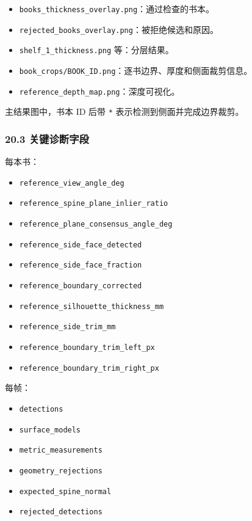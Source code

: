 \documentclass[
  chinese,
  11pt,
  a4paper,
]{article}
\providecommand{\tightlist}{%
  \setlength{\itemsep}{0pt}\setlength{\parskip}{0pt}}
\begin{document}
\begin{itemize}
\tightlist
\item
  \texttt{books\_thickness\_overlay.png}：通过检查的书本。
\item
  \texttt{rejected\_books\_overlay.png}：被拒绝候选和原因。
\item
  \texttt{shelf\_1\_thickness.png} 等：分层结果。
\item
  \texttt{book\_crops/BOOK\_ID.png}：逐书边界、厚度和侧面裁剪信息。
\item
  \texttt{reference\_depth\_map.png}：深度可视化。
\end{itemize}

主结果图中，书本 ID 后带 \texttt{*} 表示检测到侧面并完成边界裁剪。

\subsubsection{20.3
关键诊断字段}\label{203-ux5173ux952eux8bcaux65adux5b57ux6bb5}

每本书：

\begin{itemize}
\tightlist
\item
  \texttt{reference\_view\_angle\_deg}
\item
  \texttt{reference\_spine\_plane\_inlier\_ratio}
\item
  \texttt{reference\_plane\_consensus\_angle\_deg}
\item
  \texttt{reference\_side\_face\_detected}
\item
  \texttt{reference\_side\_face\_fraction}
\item
  \texttt{reference\_boundary\_corrected}
\item
  \texttt{reference\_silhouette\_thickness\_mm}
\item
  \texttt{reference\_side\_trim\_mm}
\item
  \texttt{reference\_boundary\_trim\_left\_px}
\item
  \texttt{reference\_boundary\_trim\_right\_px}
\end{itemize}

每帧：

\begin{itemize}
\tightlist
\item
  \texttt{detections}
\item
  \texttt{surface\_models}
\item
  \texttt{metric\_measurements}
\item
  \texttt{geometry\_rejections}
\item
  \texttt{expected\_spine\_normal}
\item
  \texttt{rejected\_detections}
\end{itemize}
\end{document}

